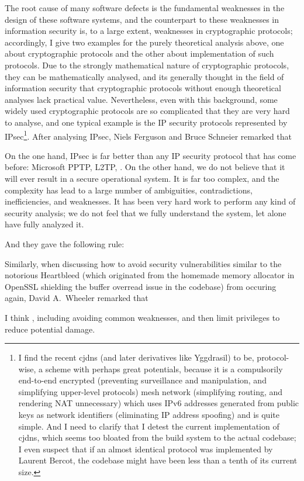 The root cause of many software defects is the fundamental weaknesses in the
design of these software systems, and the counterpart to these weaknesses in
information security is, to a large extent, weaknesses in cryptographic
protocols; accordingly, I give two examples for the purely theoretical analysis
above, one about cryptographic protocols and the other about implementation of
such protocols.  Due to the strongly mathematical nature of cryptographic
protocols, they can be mathematically analysed, and its generally thought
in the field of information security that cryptographic protocols without
enough theoretical analyses lack practical value.
Nevertheless, even with this background, some widely used cryptographic
protocols are so complicated that they are very hard to analyse, and one typical
example is the IP security protocols represented by IPsec\footnote{I find the
recent cjdns (and later derivatives like Yggdrasil) to be, protocol-wise, a
scheme with perhaps great potentials, because it is a compulsorily end-to-end
encrypted (preventing surveillance and manipulation, and simplifying upper-level
protocols) mesh network (simplifying routing, and rendering NAT unnecessary)
which uses IPv6 addresses generated from public keys as network identifiers
(eliminating IP address spoofing) and is quite simple.  And I need to clarify
that I detest the current implementation of cjdns, which seems too bloated
from the build system to the actual codebase; I even suspect that if an almost
identical protocol was implemented by Laurent Bercot, the codebase might
have been less than a tenth of its current size.}.  After analysing IPsec,
Niels Ferguson and Bruce Schneier remarked that
\begin{quoting}
	On the one hand, IPsec is far better than any IP security protocol that has
	come before: Microsoft PPTP, L2TP, \etc.  On the other hand, we do not
	believe that it will ever result in a secure operational system.  It is far
	too complex, and the complexity has lead to a large number of ambiguities,
	contradictions, inefficiencies, and weaknesses.  It has been very hard work
	to perform any kind of security analysis; we do not feel that we fully
	understand the system, let alone have fully analyzed it.
\end{quoting}
And they gave the following rule:
\begin{quoting}
\end{quoting}
Similarly, when discussing how to avoid security vulnerabilities similar to the
notorious Heartbleed (which originated from the homemade memory allocator in
OpenSSL shielding the buffer overread issue in the codebase) from occuring
again, David A.\ Wheeler remarked that
\begin{quoting}
	I think , including avoiding
	common weaknesses, and then limit privileges to reduce potential damage.
\end{quoting}

